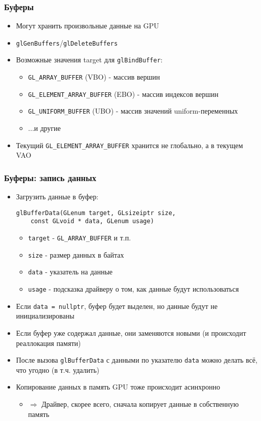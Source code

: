 \documentclass{beamer}
\begin{document}
\begin{frame}[fragile]
\frametitle{Буферы}
\begin{itemize}
\item Могут хранить произвольные данные на GPU
\pause
\item \verb|glGenBuffers|/\verb|glDeleteBuffers|
\pause
\item Возможные значения target для \verb|glBindBuffer|:
\begin{itemize}
\item \verb|GL_ARRAY_BUFFER| (VBO) - массив вершин
\pause
\item \verb|GL_ELEMENT_ARRAY_BUFFER| (EBO) - массив индексов вершин
\pause
\item \verb|GL_UNIFORM_BUFFER| (UBO) - массив значений uniform-переменных
\pause
\item ...и другие
\end{itemize}
\pause
\item Текущий \verb|GL_ELEMENT_ARRAY_BUFFER| хранится не глобально, а в текущем VAO
\end{itemize}
\end{frame}

\begin{frame}[fragile]
\frametitle{Буферы: запись данных}
\begin{itemize}
\item Загрузить данные в буфер:
\begin{verbatim}
glBufferData(GLenum target, GLsizeiptr size,
    const GLvoid * data, GLenum usage)
\end{verbatim}
\pause
\begin{itemize}
\item \verb|target| - \verb|GL_ARRAY_BUFFER| и т.п.
\item \verb|size| - размер данных в байтах
\item \verb|data| - указатель на данные
\item \verb|usage| - подсказка драйверу о том, как данные будут использоваться
\end{itemize}
\pause
\item Если \verb|data = nullptr|, буфер будет выделен, но данные будут не инициализированы
\pause
\item Если буфер уже содержал данные, они заменяются новыми (и происходит реаллокация памяти)
\pause
\item После вызова \verb|glBufferData| с данными по указателю \verb|data| можно делать всё, что угодно (в т.ч. удалить)
\item Копирование данных в память GPU тоже происходит асинхронно
\pause
\begin{itemize}
\item \begin{math}\Rightarrow\end{math} Драйвер, скорее всего, сначала копирует данные в собственную память
\end{itemize}
\end{itemize}
\end{frame}
\end{document}
